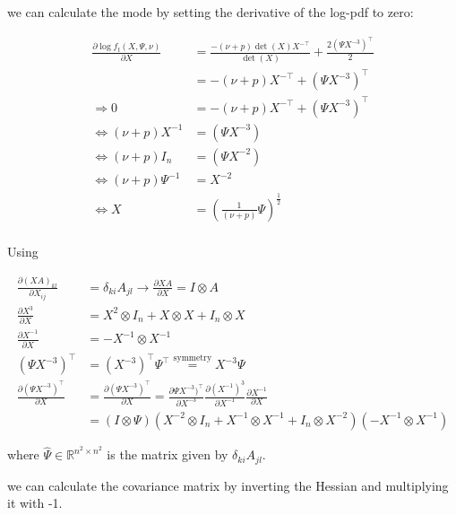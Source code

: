 we can calculate the mode by setting the derivative of the log-pdf to zero:

\begin{align*}
	\frac{\partial \log f_t(X, \Psi, \nu)}{\partial X} &= \frac{-(\nu + p )\det(X) X^{-\top}}{\det(X)} + \frac{2(\Psi X^{-3})^\top}{2} \\
	&= -(\nu + p)X^{-\top} + (\Psi X^{-3})^\top \\
	\Rightarrow 0 &= -(\nu + p)X^{-\top} + (\Psi X^{-3})^\top \\
	\Leftrightarrow (\nu + p)X^{-1} &= (\Psi X^{-3}) \\
	\Leftrightarrow (\nu + p)I_n &= (\Psi X^{-2}) \\
	\Leftrightarrow (\nu + p)\Psi^{-1} &= X^{-2} \\
	\Leftrightarrow X &= \left(\frac{1}{(\nu + p)}\Psi\right)^{\frac{1}{2}} \\
\end{align*}

Using

\begin{align*}
	\frac{\partial (XA)_{kl}}{\partial X_{ij}} &= \delta_{ki}A_{jl} \rightarrow \frac{\partial XA}{\partial X} = I \otimes A\\
	\frac{\partial X^3}{\partial X} &= X^2 \otimes I_{n} + X \otimes X + I_{n} \otimes X \\
	\frac{\partial X^{-1}}{\partial X} &= - X^{-1} \otimes X^{-1} \\
	(\Psi X^{-3})^\top &= (X^{-3})^\top \Psi^\top \overset{\text{symmetry}}{=} X^{-3} \Psi \\
	\frac{\partial (\Psi X^{-3})^\top}{\partial X} &= \frac{\partial (\Psi X^{-3})^\top}{\partial X} = \frac{\partial \Psi X^{-3})^\top}{\partial X^{-3}} \frac{\partial (X^{-1})^3}{\partial X^{-1}} \frac{\partial X^{-1}}{\partial X} \\
	&= (I\otimes \Psi) (X^{-2} \otimes I_n + X^{-1} \otimes X^{-1} + I_n \otimes X^{-2}) (-X^{-1} \otimes X^{-1})
\end{align*}

where $\hat{\Psi} \in \mathbb{R}^{n^2 \times n^2}$ is the matrix given by $\delta_{ki}A_{jl}$.

we can calculate the covariance matrix by inverting the Hessian and multiplying it with -1.

